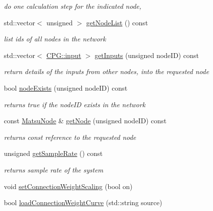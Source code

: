 \begin{DoxyCompactItemize}
\begin{DoxyCompactList}\small\item\em do one calculation step for the indicated node, \end{DoxyCompactList}\item 
std\+::vector$<$ unsigned $>$ \mbox{\hyperlink{classMatsuokaEngine_ae8f070a75e9005f6cc1f3c2b33c4baf5}{get\+Node\+List}} () const
\begin{DoxyCompactList}\small\item\em list ids of all nodes in the network \end{DoxyCompactList}\item 
std\+::vector$<$ \mbox{\hyperlink{structCPG_1_1input}{C\+P\+G\+::input}} $>$ \mbox{\hyperlink{classMatsuokaEngine_a7b8067a4f72a8376635ce2d61bece1f2}{get\+Inputs}} (unsigned node\+ID) const
\begin{DoxyCompactList}\small\item\em return details of the inputs from other nodes, into the requested node \end{DoxyCompactList}\item 
bool \mbox{\hyperlink{classMatsuokaEngine_aac87afef0c7c99601fa77e2be27b2b74}{node\+Exists}} (unsigned node\+ID) const
\begin{DoxyCompactList}\small\item\em returns true if the node\+ID exists in the network \end{DoxyCompactList}\item 
const \mbox{\hyperlink{classMatsuNode}{Matsu\+Node}} \& \mbox{\hyperlink{classMatsuokaEngine_ae2d2de39e55b20e6c579039eb6081246}{get\+Node}} (unsigned node\+ID) const
\begin{DoxyCompactList}\small\item\em returns const reference to the requested node \end{DoxyCompactList}\item 
unsigned \mbox{\hyperlink{classMatsuokaEngine_a2757e406e811cbe2e28f8b661cf29472}{get\+Sample\+Rate}} () const
\begin{DoxyCompactList}\small\item\em returns sample rate of the system \end{DoxyCompactList}\item 
void \mbox{\hyperlink{classMatsuokaEngine_adb864bf26563682f94ba2e131fb8b793}{set\+Connection\+Weight\+Scaling}} (bool on)
\item 
bool \mbox{\hyperlink{classMatsuokaEngine_ae2ad27d38196e2217bdb0b5da35fd095}{load\+Connection\+Weight\+Curve}} (std\+::string source)

\end{DoxyCompactItemize}
